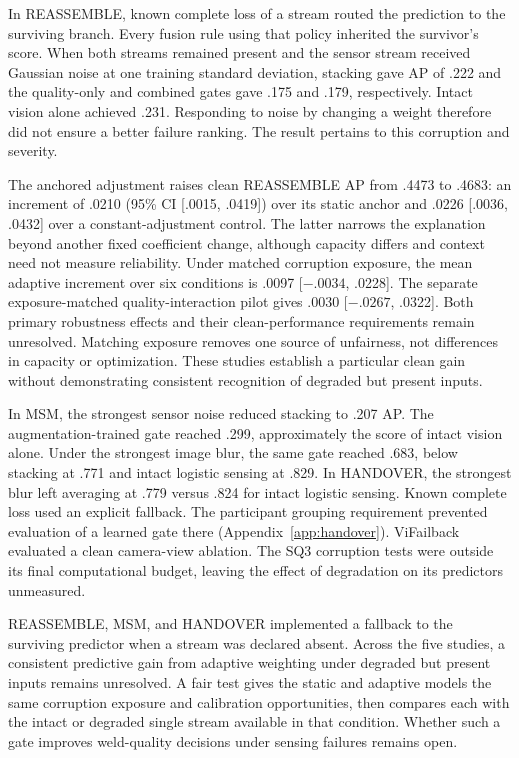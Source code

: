 In REASSEMBLE, known complete loss of a stream routed the prediction to the surviving branch. Every fusion rule using that policy inherited the survivor's score. When both streams remained present and the sensor stream received Gaussian noise at one training standard deviation, stacking gave AP of .222 and the quality-only and combined gates gave .175 and .179, respectively. Intact vision alone achieved .231. Responding to noise by changing a weight therefore did not ensure a better failure ranking. The result pertains to this corruption and severity.

The anchored adjustment raises clean REASSEMBLE AP from .4473 to .4683: an increment of .0210 (95\% CI [.0015, .0419]) over its static anchor and .0226 [.0036, .0432] over a constant-adjustment control. The latter narrows the explanation beyond another fixed coefficient change, although capacity differs and context need not measure reliability. Under matched corruption exposure, the mean adaptive increment over six conditions is .0097 [$-.0034$, .0228]. The separate exposure-matched quality-interaction pilot gives .0030 [$-.0267$, .0322]. Both primary robustness effects and their clean-performance requirements remain unresolved. Matching exposure removes one source of unfairness, not differences in capacity or optimization. These studies establish a particular clean gain without demonstrating consistent recognition of degraded but present inputs.

In MSM, the strongest sensor noise reduced stacking to .207 AP. The augmentation-trained gate reached .299, approximately the score of intact vision alone. Under the strongest image blur, the same gate reached .683, below stacking at .771 and intact logistic sensing at .829. In HANDOVER, the strongest blur left averaging at .779 versus .824 for intact logistic sensing. Known complete loss used an explicit fallback. The participant grouping requirement prevented evaluation of a learned gate there (Appendix~\ref{app:handover}). ViFailback evaluated a clean camera-view ablation. The SQ3 corruption tests were outside its final computational budget, leaving the effect of degradation on its predictors unmeasured.

REASSEMBLE, MSM, and HANDOVER implemented a fallback to the surviving predictor when a stream was declared absent. Across the five studies, a consistent predictive gain from adaptive weighting under degraded but present inputs remains unresolved. A fair test gives the static and adaptive models the same corruption exposure and calibration opportunities, then compares each with the intact or degraded single stream available in that condition. Whether such a gate improves weld-quality decisions under sensing failures remains open.

